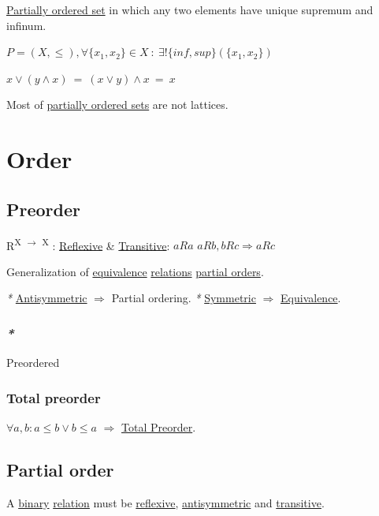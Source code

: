 \documentclass[a4paper,14pt,oneside]{book}
\begin{document}
\hyperref[orgf91f3ef]{Partially ordered set} in which any two elements have unique supremum and infinum.

\(P = (X, \le ), \forall \{x_{1}, x_{2}\} \in X \ : \ \exists! \{inf, sup\}(\{x_{1},x_{2}\})\)

\(x \lor (y \land x) \ = \ (x \lor y) \land x \ = \ x\)

Most of \hyperref[org8a36554]{partially ordered sets} are not lattices.

\section{\label{orgde40ac0}Order}
\label{sec:org529a649}

\subsection{\label{org6f15895}Preorder}
\label{sec:orgdc80b71}

R\textsuperscript{X \(\to\) X} : \hyperref[orgabd2a48]{Reflexive} \& \hyperref[org3be5573]{Transitive}:
\(aRa\)
\(aRb, bRc \Rightarrow aRc\)

Generalization of \hyperref[orge05ed23]{equivalence} \hyperref[org893ad95]{relations} \hyperref[org1efeaff]{partial orders}.

\emph{*} \hyperref[org3227878]{Antisymmetric} \(\Rightarrow\) Partial ordering.
\emph{*} \hyperref[org0617847]{Symmetric} \(\Rightarrow\) \hyperref[orge05ed23]{Equivalence}.

\subsubsection{\emph{*}}
\label{sec:org57671db}

\label{org0568bb5}Preordered

\subsubsection{\label{org54061b2}Total preorder}
\label{sec:org78e11ea}

\(\forall a,b : a \le b \lor b \le a\) \(\Rightarrow\) \hyperref[org54061b2]{Total Preorder}.

\subsection{\label{orgc772061}Partial order}
\label{sec:org0970eba}

A \hyperref[orga36d6a4]{binary} \hyperref[org5b7e58d]{relation} must be \hyperref[orgabd2a48]{reflexive}, \hyperref[org3227878]{antisymmetric} and \hyperref[org3be5573]{transitive}.
\end{document}
